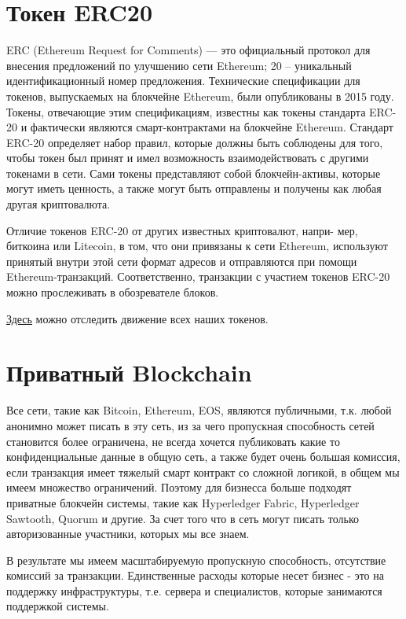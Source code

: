 \documentclass[a4paper,12pt]{report}
\newcommand{\contractAddress}{0x37d29cb7d543300063a50d85389d409c01da7945}
\begin{document}
\section{Токен ERC20}
ERC (Ethereum Request for Comments) — это официальный протокол для внесения предложений по улучшению сети Ethereum; 20 – уникальный идентификационный номер предложения. Технические спецификации для токенов, выпускаемых на блокчейне Ethereum, были опубликованы в 2015 году. Токены, отвечающие этим спецификациям, известны как токены стандарта ERC-20 и фактически являются смарт-контрактами на блокчейне Ethereum. Стандарт ERC-20 определяет набор правил, которые должны быть
соблюдены для того, чтобы токен был принят и имел возможность взаимодействовать с другими токенами в сети. Сами токены представляют собой блокчейн-активы, которые могут иметь ценность, а также могут быть отправлены и получены как любая другая криптовалюта. 

Отличие токенов ERC-20 от других известных криптовалют, напри-
мер, биткоина или Litecoin, в том, что они привязаны к сети Ethereum, используют принятый внутри этой сети формат адресов и отправляются при помощи Ethereum-транзакций. Соответственно, транзакции с участием токенов ERC-20 можно прослеживать в обозревателе блоков.


\href{https://etherscan.io/address/\contractAddress}{Здесь} можно отследить движение всех наших токенов.

\section{Приватный Blockchain}
Все сети, такие как Bitcoin, Ethereum, EOS, являются публичными, т.к. любой анонимно может писать в эту сеть, из за чего пропускная способность сетей становится более ограничена, не всегда хочется публиковать какие то конфиденциальные данные в общую сеть, а также будет очень большая комиссия, если транзакция имеет тяжелый смарт контракт со сложной логикой, в общем мы имеем множество ограничений. Поэтому для бизнесса больше подходят приватные блокчейн системы, такие как Hyperledger Fabric, Hyperledger Sawtooth, Quorum и другие. За счет того что в сеть могут писать только авторизованные участники, которых мы все знаем. 

В результате мы имеем масштабируемую пропускную способность, отсутствие комиссий за транзакции. Единственные расходы которые несет бизнес - это на поддержку инфраструктуры, т.е. сервера и специалистов, которые занимаются поддержкой системы.
\end{document}
